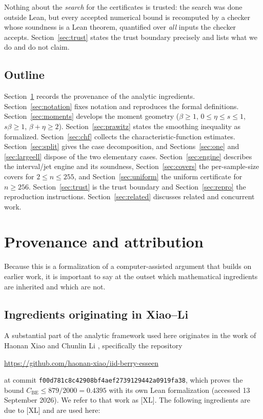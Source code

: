 \documentclass[11pt,a4paper]{article}
\theoremstyle{definition}
\begin{document}
Nothing about the \emph{search} for the certificates is trusted: the search was
done outside Lean, but every accepted numerical bound is recomputed by a checker
whose soundness is a Lean theorem, quantified over \emph{all} inputs the checker
accepts. Section~\ref{sec:trust} states the trust boundary precisely and lists
what we do and do not claim.

\subsection{Outline}

Section~\ref{sec:attribution} records the provenance of the analytic
ingredients. Section~\ref{sec:notation} fixes notation and reproduces the formal
definitions. Section~\ref{sec:moments} develops the moment geometry
($\beta\ge1$, $0\le\eta\le s\le1$, $s\beta\ge1$, $\beta+\eta\ge2$).
Section~\ref{sec:prawitz} states the smoothing inequality as formalized.
Section~\ref{sec:chf} collects the characteristic-function estimates.
Section~\ref{sec:split} gives the case decomposition, and
Sections~\ref{sec:one} and \ref{sec:largeell} dispose of the two elementary
cases. Section~\ref{sec:engine} describes the interval/jet engine and its
soundness, Section~\ref{sec:covers} the per-sample-size covers for
$2\le n\le255$, and Section~\ref{sec:uniform} the uniform certificate for
$n\ge256$. Section~\ref{sec:trust} is the trust boundary and
Section~\ref{sec:repro} the reproduction instructions.
Section~\ref{sec:related} discusses related and concurrent work.

\section{Provenance and attribution}
\label{sec:attribution}

Because this is a formalization of a computer-assisted argument that builds on
earlier work, it is important to say at the outset which mathematical
ingredients are inherited and which are not.

\subsection{Ingredients originating in Xiao--Li}

A substantial part of the analytic framework used here originates in the work of
Haonan Xiao and Chunlin Li \cite{XiaoLi2026}, specifically the repository
\begin{center}
\url{https://github.com/haonan-xiao/iid-berry-esseen}
\end{center}
at commit \texttt{f00d781c8c42908bf4aef2739129442a0919fa38}, which proves the
bound $C_{\mathrm{BE}}\le 879/2000=0.4395$ with its own Lean formalization
(accessed 13 September 2026). We refer to that work as [XL]. The following
ingredients are due to [XL] and are used here:
\end{document}
